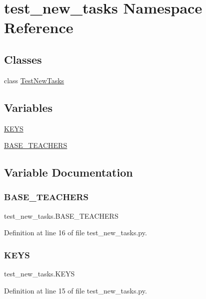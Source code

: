 \hypertarget{namespacetest__new__tasks}{}\section{test\+\_\+new\+\_\+tasks Namespace Reference}
\label{namespacetest__new__tasks}
\subsection*{Classes}
\begin{DoxyCompactItemize}
\item 
class \hyperlink{classtest__new__tasks_1_1TestNewTasks}{Test\+New\+Tasks}
\end{DoxyCompactItemize}
\subsection*{Variables}
\begin{DoxyCompactItemize}
\item 
\hyperlink{namespacetest__new__tasks_a80551a2fe33f306b46e581b77e13b420}{K\+E\+YS}
\item 
\hyperlink{namespacetest__new__tasks_a31c7cb948ec33fba2b271b92281bab47}{B\+A\+S\+E\+\_\+\+T\+E\+A\+C\+H\+E\+RS}
\end{DoxyCompactItemize}


\subsection{Variable Documentation}
\mbox{\label{namespacetest__new__tasks_a31c7cb948ec33fba2b271b92281bab47}} 
\subsubsection{\texorpdfstring{B\+A\+S\+E\+\_\+\+T\+E\+A\+C\+H\+E\+RS}{BASE\_TEACHERS}}
{\footnotesize\ttfamily test\+\_\+new\+\_\+tasks.\+B\+A\+S\+E\+\_\+\+T\+E\+A\+C\+H\+E\+RS}



Definition at line 16 of file test\+\_\+new\+\_\+tasks.\+py.

\mbox{\label{namespacetest__new__tasks_a80551a2fe33f306b46e581b77e13b420}} 
\subsubsection{\texorpdfstring{K\+E\+YS}{KEYS}}
{\footnotesize\ttfamily test\+\_\+new\+\_\+tasks.\+K\+E\+YS}



Definition at line 15 of file test\+\_\+new\+\_\+tasks.\+py.


